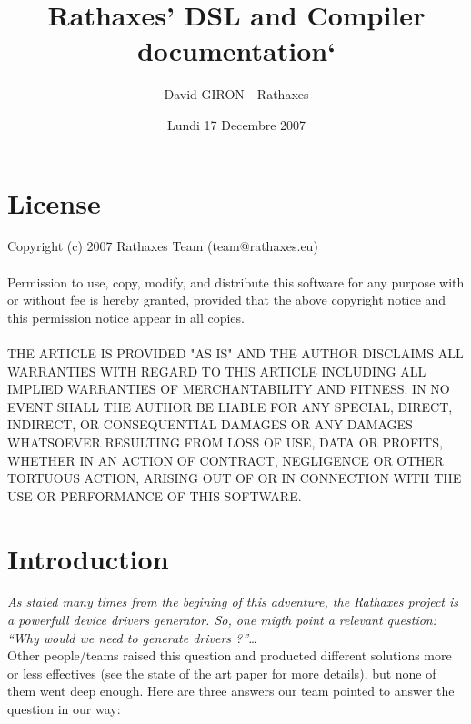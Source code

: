\documentclass[a4paper,11pt]{report}
\title{Rathaxes' DSL and Compiler documentation`}
\author{David GIRON - Rathaxes}
\date{Lundi 17 Decembre 2007}
\begin{document}
  \maketitle




  \section*{License}
  Copyright (c) 2007 Rathaxes Team (team@rathaxes.eu)
  \\\\
  Permission to use, copy, modify, and distribute this software for any
  purpose with or without fee is hereby granted, provided that the above
  copyright notice and this permission notice appear in all copies.
  \\\\
  THE ARTICLE IS PROVIDED "AS IS" AND THE AUTHOR DISCLAIMS ALL WARRANTIES
  WITH REGARD TO THIS ARTICLE INCLUDING ALL IMPLIED WARRANTIES OF
  MERCHANTABILITY AND FITNESS. IN NO EVENT SHALL THE AUTHOR BE LIABLE FOR
  ANY SPECIAL, DIRECT, INDIRECT, OR CONSEQUENTIAL DAMAGES OR ANY DAMAGES
  WHATSOEVER RESULTING FROM LOSS OF USE, DATA OR PROFITS, WHETHER IN AN
  ACTION OF CONTRACT, NEGLIGENCE OR OTHER TORTUOUS ACTION, ARISING OUT OF
  OR IN CONNECTION WITH THE USE OR PERFORMANCE OF THIS SOFTWARE.
  \newpage




  \section*{Introduction}

  \textit{As stated many times from the begining of this adventure, the Rathaxes project
    is a powerfull device drivers generator. So, one migth point a relevant question:
    ``Why would we need to generate drivers ?''\dots}\\
  
  Other people/teams raised this question and producted different solutions
  more or less effectives (see the state of the art paper for more details),
  but none of them went deep enough. Here are three answers our team pointed
  to answer the question in our way:
  
\end{document}
